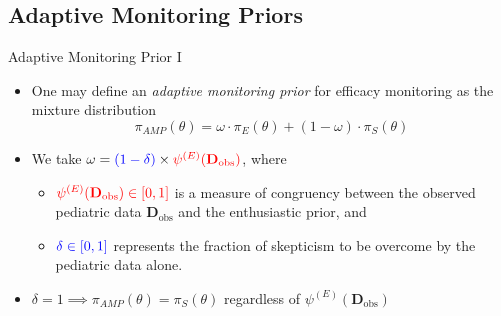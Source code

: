 \documentclass{beamer}
\begin{document}
\subsection{Adaptive Monitoring Priors}

\begin{frame}{Adaptive Monitoring Prior I}
\begin{itemize}
	\item 
	One may define an \textit{adaptive monitoring prior} for efficacy monitoring as the mixture distribution	
	\begin{equation*}
		\pi_{AMP}\left(\theta\right)=\omega\cdot\pi_E(\theta)+(1 - \omega)\cdot \pi_S(\theta)
	\end{equation*}
	
	\vspace{0.2cm}
	\item We take $\omega = \textcolor{blue}{(1 - \delta)} \times \textcolor{red}{\psi^{(E)}(\mathbf{D}_{\text{obs}})}$, where 
	
	\begin{itemize}
	  \vspace{0.2cm}	
		\item $\textcolor{red}{\psi^{(E)}(\mathbf{D}_{\text{obs}}) \in [0,1]}$ is a measure
		      of congruency between the observed pediatric data $\mathbf{D}_{\text{obs}}$ and the enthusiastic prior, and
					
		\vspace{0.2cm}		
		\item $\textcolor{blue}{\delta \in [0,1]}$ represents the fraction of skepticism to be overcome by the pediatric
		      data alone.			
	\end{itemize}
	
		\vspace{0.2cm}								
		\item $\delta=1 \implies \pi_{AMP}\left(\theta\right) = \pi_{S}\left(\theta\right)$ regardless of $\psi^{(E)}(\mathbf{D}_{\text{obs}})$	
					
\end{itemize}
\end{frame}
\end{document}
